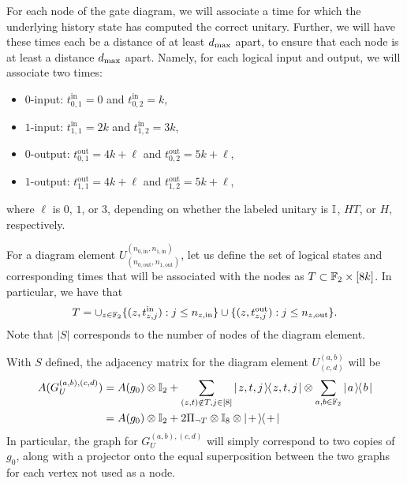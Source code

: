 \documentclass[../thesis-main/thesis-main]{subfiles}
\begin{document}
For each node of the gate diagram, we will associate a time for which the underlying history state has computed the correct unitary.  Further, we will have these times each be a distance of at least $d_{\text{max}}$ apart, to ensure that each node is at least a distance $d_{\text{max}}$ apart.  Namely, for each logical input and output, we will associate two times:
\begin{itemize}
  \item $0$-input: $t_{0,1}^{\text{in}} = 0$ and $t_{0,2}^{\text{in}} = k$,
  \item $1$-input: $t_{1,1}^{\text{in}} = 2k$ and $t_{1,2}^{\text{in}} = 3k$,
  \item $0$-output: $t_{0,1}^{\text{out}} = 4k+\ell$ and $t_{0,2}^{\text{out}} = 5k+\ell$,
  \item $1$-output: $t_{1,1}^{\text{out}} = 4k+\ell$ and $t_{1,2}^{\text{out}} = 5k+\ell$,
\end{itemize}
where $\ell$ is $0$, $1$, or $3$, depending on whether the labeled unitary is $\mathbb{I}$, $HT$, or $H$, respectively.

For a diagram element $U^{(n_{0,\text{in}},n_{1,\text{in}})}_{(n_{0,\text{out}},n_{1,\text{out}})}$, let us define the set of logical states and corresponding times that will be associated with the nodes as $T\subset \mathbb{F}_2 \times [8k]$. In particular, we have that 
\begin{equation}
  T =\cup_{z\in \mathbb{F}_2} \{(z, t_{z,j}^{\text{in}} ): j \leq n_{z,\text{in}}\} \cup \{(z, t_{z,j}^{\text{out}}) : j \leq n_{z,\text{out}}\}.
\end{equation}
Note that $|S|$ corresponds to the number of nodes of the diagram element.

With $S$ defined, the adjacency matrix for the diagram element $U^{(a,b)}_{(c,d)}$ will be
\begin{align}
  A(G_U^{(a,b),(c,d)}) &= A(g_0) \otimes \mathbb{I}_{2} + \sum_{(z,t)\notin T,j\in[8]} |\mspace{2mu} z,t,j \mspace{2mu} \rangle\mspace{-2mu}\langle\mspace{2mu} z,t,j \mspace{2mu} | \otimes \sum_{a,b\in \mathbb{F}_2} |\mspace{2mu} a \mspace{2mu} \rangle\mspace{-2mu}\langle\mspace{2mu} b \mspace{2mu} | \\
   &= A(g_0)\otimes \mathbb{I}_2 + 2 \Pi_{\lnot T} \otimes \mathbb{I}_{8} \otimes |\mspace{2mu} + \mspace{2mu} \rangle\mspace{-2mu}\langle\mspace{2mu} + \mspace{2mu} |
\label{eq:diagram_element}
\end{align}
In particular, the graph for $G_U^{(a,b),(c,d)}$ will simply correspond to two copies of $g_0$, along with a projector onto the equal superposition between the two graphs for each vertex not used as a node.
\end{document}
